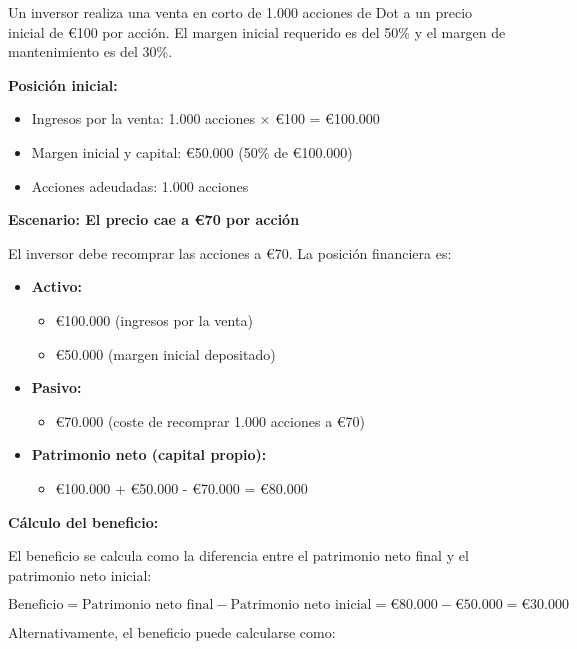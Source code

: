 \begin{ejemplo}
Un inversor realiza una venta en corto de 1.000 acciones de Dot a un precio inicial de €100 por acción. El margen inicial requerido es del 50\% y el margen de mantenimiento es del 30\%.

\textbf{Posición inicial:}
\begin{itemize}
\item Ingresos por la venta: 1.000 acciones × €100 = €100.000
\item Margen inicial y capital: €50.000 (50\% de €100.000)
\item Acciones adeudadas: 1.000 acciones
\end{itemize}

\textbf{Escenario: El precio cae a €70 por acción}

El inversor debe recomprar las acciones a €70. La posición financiera es:

\begin{itemize}
\item \textbf{Activo:}
\begin{itemize}
\item €100.000 (ingresos por la venta)
\item €50.000 (margen inicial depositado)
\end{itemize}
\item \textbf{Pasivo:}
\begin{itemize}
\item €70.000 (coste de recomprar 1.000 acciones a €70)
\end{itemize}
\item \textbf{Patrimonio neto (capital propio):}
\begin{itemize}
\item €100.000 + €50.000 - €70.000 = €80.000
\end{itemize}
\end{itemize}

\textbf{Cálculo del beneficio:}

El beneficio se calcula como la diferencia entre el patrimonio neto final y el patrimonio neto inicial:

\begin{equation}
\text{Beneficio} = \text{Patrimonio neto final} - \text{Patrimonio neto inicial} = €80.000 - €50.000 = €30.000
\end{equation}

Alternativamente, el beneficio puede calcularse como:


\end{ejemplo}
